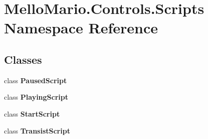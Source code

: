 \section{Mello\+Mario.\+Controls.\+Scripts Namespace Reference}
\label{namespaceMelloMario_1_1Controls_1_1Scripts}
\subsection*{Classes}
\begin{DoxyCompactItemize}
\item 
class \textbf{ Paused\+Script}
\item 
class \textbf{ Playing\+Script}
\item 
class \textbf{ Start\+Script}
\item 
class \textbf{ Transist\+Script}
\end{DoxyCompactItemize}
